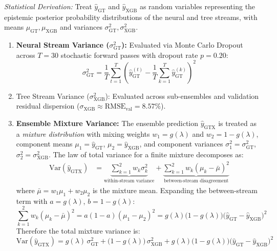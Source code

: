 \documentclass[11pt]{article}
\begin{document}
\noindent\textit{Statistical Derivation:} Treat $\hat{y}_{\mathrm{GT}}$ and $\hat{y}_{\mathrm{XGB}}$ as random variables representing the epistemic posterior probability distributions of the neural and tree streams, with means $\mu_{\mathrm{GT}}, \mu_{\mathrm{XGB}}$ and variances $\sigma_{\mathrm{GT}}^2, \sigma_{\mathrm{XGB}}^2$. 
\begin{enumerate}[leftmargin=1.0cm]
    \item \textbf{Neural Stream Variance ($\sigma_{\mathrm{GT}}^2$):} Evaluated via Monte Carlo Dropout across $T = 30$ stochastic forward passes with dropout rate $p = 0.20$:
    \begin{equation}
    \sigma_{\mathrm{GT}}^2 = \frac{1}{T} \sum_{t=1}^T \left( \hat{y}_{\mathrm{GT}}^{(t)} - \frac{1}{T}\sum_{k=1}^T \hat{y}_{\mathrm{GT}}^{(k)} \right)^2
    \label{eq:s_mc_dropout}
    \end{equation}
    \item Tree Stream Variance ($\sigma_{\mathrm{XGB}}^2$): Evaluated across sub-ensembles and validation residual dispersion ($\sigma_{\mathrm{XGB}} \approx \mathrm{RMSE}_{\mathrm{val}} = 8.57\%$).
    \item \textbf{Ensemble Mixture Variance:} The ensemble prediction $\hat{y}_{\mathrm{GTX}}$ is treated as a \emph{mixture distribution} with mixing weights $w_1 = g(\lambda)$ and $w_2 = 1 - g(\lambda)$, component means $\mu_1 = \hat{y}_{\mathrm{GT}}$, $\mu_2 = \hat{y}_{\mathrm{XGB}}$, and component variances $\sigma_1^2 = \sigma_{\mathrm{GT}}^2$, $\sigma_2^2 = \sigma_{\mathrm{XGB}}^2$. The law of total variance for a finite mixture decomposes as:
    \begin{align}
    \mathrm{Var}(\hat{y}_{\mathrm{GTX}}) &= \underbrace{\sum_{k=1}^{2} w_k \sigma_k^2}_{\text{within-stream variance}} + \underbrace{\sum_{k=1}^{2} w_k (\mu_k - \bar{\mu})^2}_{\text{between-stream disagreement}}
    \label{eq:s_law_total_var}
    \end{align}
    where $\bar{\mu} = w_1\mu_1 + w_2\mu_2$ is the mixture mean. Expanding the between-stream term with $a = g(\lambda)$, $b = 1 - g(\lambda)$:
    \begin{equation}
    \sum_{k=1}^{2} w_k (\mu_k - \bar{\mu})^2 = a(1-a)(\mu_1 - \mu_2)^2 = g(\lambda)\bigl(1-g(\lambda)\bigr)\bigl(\hat{y}_{\mathrm{GT}} - \hat{y}_{\mathrm{XGB}}\bigr)^2
    \label{eq:s_between_var}
    \end{equation}
    Therefore the total mixture variance is:
    \begin{equation}
    \mathrm{Var}(\hat{y}_{\mathrm{GTX}}) = g(\lambda)\,\sigma_{\mathrm{GT}}^2 + \bigl(1 - g(\lambda)\bigr)\,\sigma_{\mathrm{XGB}}^2 + g(\lambda)\bigl(1-g(\lambda)\bigr)\bigl(\hat{y}_{\mathrm{GT}} - \hat{y}_{\mathrm{XGB}}\bigr)^2

\end{equation}
\end{enumerate}
\end{document}
